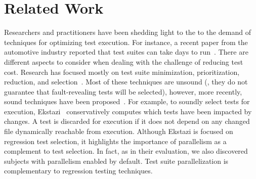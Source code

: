 \section{Related Work}
\label{sec:related}
Researchers and practitioners have been shedding light to the to the
demand of techniques for optimizing test execution. For instance, a
recent paper from the automotive industry reported that test suites
can take days to run~\cite{artl-etal-icst2015}.  There are different
aspects to consider when dealing with the challenge of reducing
test cost. 
Research has focused mostly on test suite minimization,
prioritization, reduction, and selection~\cite{yoo-harman-stvr2012}.
Most of these techniques are unsound (\ie{}, they do not guarantee
that fault-revealing tests will be selected), however, more recently,
sound techniques have been
proposed~\cite{gligoric-etal-issta2015,soetens-etal-2016}.  For
example, to soundly select tests for execution,
Ekstazi~\cite{ekstazi-web,gligoric-etal-issta2015} conservatively
computes which tests have been impacted by changes.  A test is
discarded for execution if it does not depend on any changed file
dynamically reachable from execution. Although Ekstazi is focused on
regression test selection, it highlights the importance of parallelism
as a complement to test selection.  In fact, as in their evaluation, we
also discovered subjects with parallelism enabled by default.  Test
suite parallelization is complementary to regression testing techniques.

